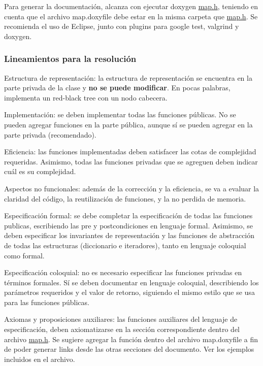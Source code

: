 Para generar la documentación, alcanza con ejecutar {\ttfamily doxygen \hyperlink{map_8h}{map.\-h}}, teniendo en cuenta que el archivo {\ttfamily map.\-doxyfile} debe estar en la misma carpeta que {\ttfamily \hyperlink{map_8h}{map.\-h}}. Se recomienda el uso de Eclipse, junto con plugins para {\ttfamily google test}, {\ttfamily valgrind} y {\ttfamily doxygen}.\hypertarget{Enunciado_enun-lineamiento}{}\subsubsection{Lineamientos para la resolución}\label{Enunciado_enun-lineamiento}

\begin{DoxyItemize}
\item Estructura de representación\-: la estructura de representación se encuentra en la parte privada de la clase y {\bfseries no se puede modificar}. En pocas palabras, implementa un red-\/black tree con un nodo cabecera.
\item Implementación\-: se deben implementar todas las funciones públicas. No se pueden agregar funciones en la parte pública, aunque sí se pueden agregar en la parte privada (recomendado).
\item Eficiencia\-: las funciones implementadas deben satisfacer las cotas de complejidad requeridas. Asimismo, todas las funciones privadas que se agreguen deben indicar cuál es su complejidad.
\item Aspectos no funcionales\-: además de la corrección y la eficiencia, se va a evaluar la claridad del código, la reutilización de funciones, y la no perdida de memoria.
\item Especificación formal\-: se debe completar la especificación de todas las funciones publicas, escribiendo las pre y postcondiciones en lenguaje formal. Asimismo, se deben especificar los invariantes de representación y las funciones de abstracción de todas las estructuras (diccionario e iteradores), tanto en lenguaje coloquial como formal.
\item Especificación coloquial\-: no es necesario especificar las funciones privadas en términos formales. Sí se deben documentar en lenguaje coloquial, describiendo los parámetros requeridos y el valor de retorno, siguiendo el mismo estilo que se usa para las funciones públicas.
\item Axiomas y proposiciones auxiliares\-: las funciones auxiliares del lenguaje de especificación, deben axiomatizarse en la sección correspondiente dentro del archivo {\ttfamily \hyperlink{map_8h}{map.\-h}}. Se sugiere agregar la función dentro del archivo {\ttfamily map.\-doxyfile} a fin de poder generar links desde las otras secciones del documento. Ver los ejemplos incluidos en el archivo.

\end{DoxyItemize}
